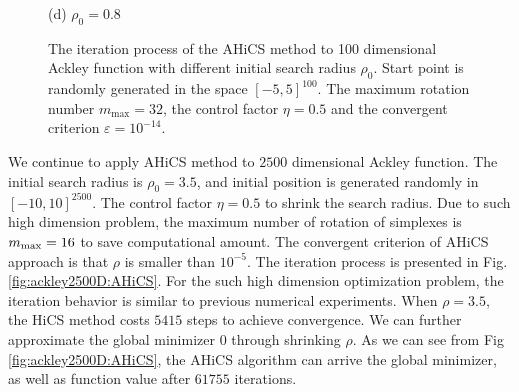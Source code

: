 \documentclass[final,1p,times]{elsarticle}
\begin{document}
\begin{figure}[!htbp]
\begin{minipage}[b]{0.5\linewidth}
{	  }
	\centerline{(d) $\rho_0 =0.8$}
	\end{minipage}
	  \caption{The iteration process of the AHiCS method to 100
	  dimensional Ackley function with different initial search
	  radius $\rho_0$. Start point is randomly generated in the
	  space $[-5, 5]^{100}$. The maximum rotation number
	  $m_{\max}=32$, the control factor $\eta=0.5$ and the
	  convergent criterion $\varepsilon=10^{-14}$.  } 
	  \label{fig:ackley100D:AHiCS:randinit}
\end{figure}

We continue to apply AHiCS method to $2500$ dimensional
Ackley function. The initial search radius is $\rho_0=3.5$, and
initial position is generated randomly in $[-10,10]^{2500}$. 
The control factor $\eta=0.5$ to shrink the search radius. 
Due to such high dimension problem, the maximum number of
rotation of simplexes is $m_{\rm max}=16$ to save computational amount.
The convergent criterion of AHiCS approach is that $\rho$ is smaller than $10^{-5}$.
The iteration process is presented in
Fig.\,\ref{fig:ackley2500D:AHiCS}. 
For the such high dimension optimization problem, the iteration
behavior is similar to previous numerical experiments. 
When $\rho=3.5$, the HiCS method costs $5415$ steps to achieve
convergence. We can further approximate the global
minimizer $0$ through shrinking $\rho$. 
As we can see from Fig\,\ref{fig:ackley2500D:AHiCS}, 
the AHiCS algorithm can arrive the global minimizer, as well as
function value after $61755$ iterations.
\end{document}
